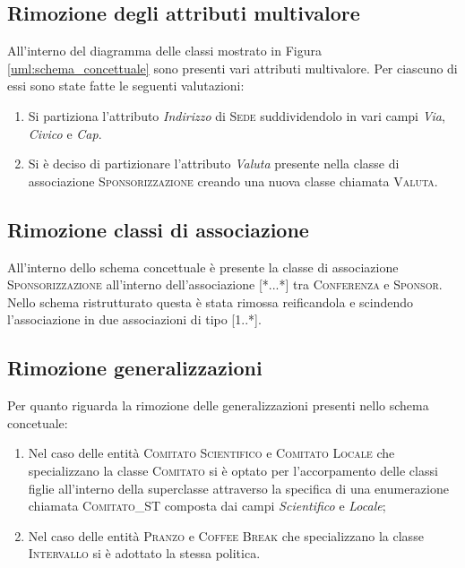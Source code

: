 \subsection{Rimozione degli attributi multivalore}All'interno del diagramma delle classi mostrato in Figura \ref{uml:schema_concettuale} sono presenti vari attributi multivalore. Per ciascuno di essi sono state fatte le seguenti valutazioni:
\begin{enumerate}
	\item Si partiziona l'attributo \textit{Indirizzo} di \textsc{Sede} suddividendolo in vari campi \textit{Via}, \textit{Civico} e \textit{Cap}.
	\item Si è deciso di partizionare l'attributo \textit{Valuta} presente nella classe di associazione \textsc{Sponsorizzazione} creando una nuova classe chiamata \textsc{Valuta}.
\end{enumerate}
\subsection{Rimozione classi di associazione}
All'interno dello schema concettuale è presente la classe di associazione \textsc{Sponsorizzazione} all'interno dell'associazione [*...*] tra \textsc{Conferenza} e \textsc{Sponsor}. Nello schema ristrutturato questa è stata rimossa reificandola e scindendo l'associazione in due associazioni di tipo [1..*].
\subsection{Rimozione generalizzazioni}
Per quanto riguarda la rimozione delle generalizzazioni presenti nello schema concetuale:
\begin{enumerate}
	\item Nel caso delle entità \textsc{Comitato Scientifico} e \textsc{Comitato Locale} che specializzano la classe \textsc{Comitato} si è optato per l'accorpamento delle classi figlie all'interno della superclasse attraverso la specifica di una enumerazione chiamata \textsc{Comitato\_ST} composta dai campi \textit{Scientifico} e \textit{Locale};
	\item Nel caso delle entità \textsc{Pranzo} e \textsc{Coffee Break} che specializzano la classe \textsc{Intervallo} si è adottato la stessa politica.
\end{enumerate}
